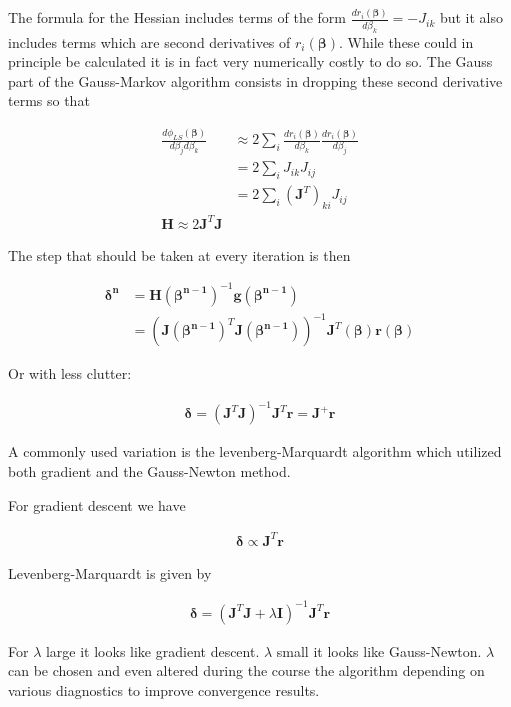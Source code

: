 \documentclass[12pt]{article}
\newcommand{\bv}[1]{\boldsymbol{#1}}
\begin{document}
The formula for the Hessian includes terms of the form $\frac{dr_i(\bv{\beta})}{d\beta_k} = -J_{ik}$ but it also includes terms which are second derivatives of $r_i(\bv{\beta})$.
While these could in principle be calculated it is in fact very numerically costly to do so.
The Gauss part of the Gauss-Markov algorithm consists in dropping these second derivative terms so that

\begin{align}
\frac{d\phi_{LS}(\bv{\beta})}{d\beta_jd\beta_k} &\approx 2 \sum_i \frac{dr_i(\bv{\beta})}{d\beta_k}\frac{dr_i(\bv{\beta})}{d\beta_j}\\
&= 2\sum_i J_{ik}J_{ij}\\
&= 2\sum_i (\bv{J}^T)_{ki}J_{ij}\\
\bv{H} \approx 2\bv{J}^T\bv{J}
\end{align}

The step that should be taken at every iteration is then

\begin{align}
\bv{\delta^n} &= \bv{H}(\bv{\beta^{n-1}})^{-1}\bv{g}(\bv{\beta^{n-1}})\\
&= \left(\bv{J}(\bv{\beta^{n-1}})^T\bv{J}(\bv{\beta^{n-1}})\right)^{-1}\bv{J}^T(\bv{\beta})\bv{r}(\bv{\beta})
\end{align}

Or with less clutter:

\begin{align}
\bv{\delta} = (\bv{J}^T\bv{J})^{-1}\bv{J}^T\bv{r} = \bv{J}^+\bv{r}
\end{align}

A commonly used variation is the levenberg-Marquardt algorithm which utilized both gradient and the Gauss-Newton method.

For gradient descent we have

\begin{align}
\bv{\delta} \propto \bv{J}^T\bv{r}
\end{align}

Levenberg-Marquardt is given by

\begin{align}
\bv{\delta} = \left(\bv{J}^T\bv{J} + \lambda \bv{I}\right)^{-1}\bv{J}^T\bv{r}
\end{align}

For $\lambda$ large it looks like gradient descent. 
$\lambda$ small it looks like Gauss-Newton.
$\lambda$ can be chosen and even altered during the course the algorithm depending on various diagnostics to improve convergence results.
\end{document}
